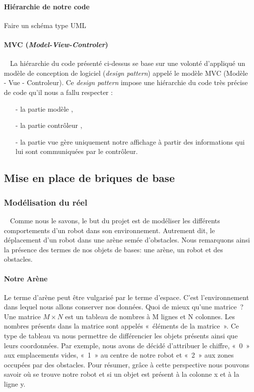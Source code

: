 \documentclass[12pt]{article}
\def\tab{$\>\>\>\>$}
\begin{document}
\paragraph{Hiérarchie de notre code\\}

\begin{center}
Faire un schéma type UML
\end{center}


\paragraph{MVC (\textit{Model-View-Controler})\\}
\tab La hiérarchie du code présenté ci-dessus se base sur une volonté d'appliqué un modèle de conception de logiciel (\textit{design pattern}) appelé le modèle MVC (Modèle - Vue - Controleur). Ce \textit{design pattern} impose une hiérarchie du code très précise de code qu'il nous a fallu respecter : \begin{itemize}
\item[-] la partie modèle ,
\item[-] la partie contrôleur ,
\item[-] la partie vue gère uniquement notre affichage à partir des informations qui lui sont communiquées par le contrôleur.
\end{itemize}
\newpage
\subsection{Mise en place de briques de base}
\subsubsection{Modélisation du réel}
\tab Comme nous le savons, le but du projet est de modéliser les différents comportements d’un robot dans son environnement. Autrement dit, le déplacement d’un robot dans une arène semée d’obstacles. Nous remarquons ainsi la présence des termes de nos objets de bases: une arène, un robot et des obstacles.
\paragraph{Notre Arène\\}
Le terme d’arène peut être vulgarisé par le terme d’espace. C’est l’environnement dans lequel nous allons conserver nos données. Quoi de mieux qu’une matrice ? Une matrice $M \times N$ est un tableau de nombres à M lignes et N colonnes. Les nombres présents dans la matrice sont appelés « éléments de la matrice ».  Ce type de tableau va nous permettre de différencier les objets présents ainsi que leurs coordonnées. Par exemple, nous avons de décidé d’attribuer le chiffre, « 0 » aux emplacements vides, « 1 » au centre de notre robot et « 2 » aux zones occupées par des obstacles. Pour résumer, grâce à cette perspective nous pouvons savoir où se trouve notre robot et si un objet est présent à la colonne x et à la ligne y.
\end{document}
